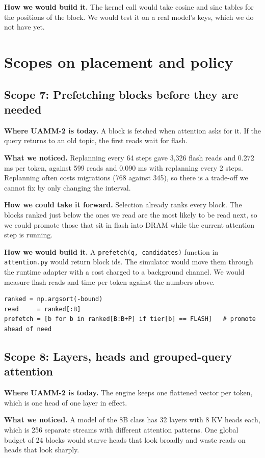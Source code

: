 \documentclass[12pt,a4paper]{report}
\begin{document}
\textbf{How we would build it.} The kernel call would take cosine and sine tables for the positions of the block. We would test it on a real model's keys, which we do not have yet.

\section{Scopes on placement and policy}
\subsection{Scope 7: Prefetching blocks before they are needed}
\textbf{Where UAMM-2 is today.} A block is fetched when attention asks for it. If the query returns to an old topic, the first reads wait for flash.

\textbf{What we noticed.} Replanning every 64 steps gave 3,326 flash reads and 0.272 ms per token, against 599 reads and 0.090 ms with replanning every 2 steps. Replanning often costs migrations (768 against 345), so there is a trade-off we cannot fix by only changing the interval.

\textbf{How we could take it forward.} Selection already ranks every block. The blocks ranked just below the ones we read are the most likely to be read next, so we could promote those that sit in flash into DRAM while the current attention step is running.

\textbf{How we would build it.} A \texttt{prefetch(q, candidates)} function in \texttt{attention.\allowbreak{}py} would return block ids. The simulator would move them through the runtime adapter with a cost charged to a background channel. We would measure flash reads and time per token against the numbers above.

\begin{lstlisting}
ranked = np.argsort(-bound)
read     = ranked[:B]
prefetch = [b for b in ranked[B:B+P] if tier[b] == FLASH]   # promote ahead of need
\end{lstlisting}
\subsection{Scope 8: Layers, heads and grouped-query attention}
\textbf{Where UAMM-2 is today.} The engine keeps one flattened vector per token, which is one head of one layer in effect.

\textbf{What we noticed.} A model of the 8B class has 32 layers with 8 KV heads each, which is 256 separate streams with different attention patterns. One global budget of 24 blocks would starve heads that look broadly and waste reads on heads that look sharply.
\end{document}
